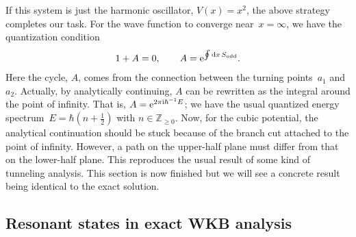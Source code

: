 If this system is just the harmonic oscillator, $V(x)=x^2$,
the above strategy completes our task.
For the wave function to converge near~$x=\infty$,
we have the quantization condition
\begin{align}
    1 + A = 0, \qquad
    A = \mathrm{e}^{\oint \mathrm{d} x\, S_{\mathrm{odd}}} .
\end{align}
Here the cycle, $A$, comes from the connection between the turning points~$a_1$ and $a_2$.
Actually, by analytically continuing,
$A$ can be rewritten as the integral around the point of infinity.
That is, $A=\mathrm{e}^{2\pi \mathrm{i}  \hbar^{-1} E}$;
we have the usual quantized energy spectrum~$E=\hbar\left(n+\frac{1}{2}\right)$ with $n\in\mathbb{Z}_{\geq0}$.
Now, for the cubic potential, the analytical continuation should be stuck because of the branch cut attached to the point of infinity.
However, a path on the upper-half plane must differ from that on the lower-half plane.
This reproduces the usual result of some kind of tunneling analysis.
This section is now finished but we will see a concrete result
being identical to the exact solution.
\subsection{Resonant states in exact WKB analysis}\label{src:2503_18741:sec:res_ewkb}
